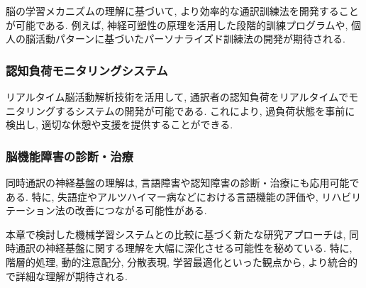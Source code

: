 脳の学習メカニズムの理解に基づいて, より効率的な通訳訓練法を開発することが可能である.
例えば, 神経可塑性の原理を活用した段階的訓練プログラムや, 個人の脳活動パターンに基づいたパーソナライズド訓練法の開発が期待される.

\subsubsection{認知負荷モニタリングシステム}

リアルタイム脳活動解析技術を活用して, 通訳者の認知負荷をリアルタイムでモニタリングするシステムの開発が可能である.
これにより, 過負荷状態を事前に検出し, 適切な休憩や支援を提供することができる.

\subsubsection{脳機能障害の診断・治療}

同時通訳の神経基盤の理解は, 言語障害や認知障害の診断・治療にも応用可能である.
特に, 失語症やアルツハイマー病などにおける言語機能の評価や, リハビリテーション法の改善につながる可能性がある.

本章で検討した機械学習システムとの比較に基づく新たな研究アプローチは, 同時通訳の神経基盤に関する理解を大幅に深化させる可能性を秘めている.
特に, 階層的処理, 動的注意配分, 分散表現, 学習最適化といった観点から, より統合的で詳細な理解が期待される.